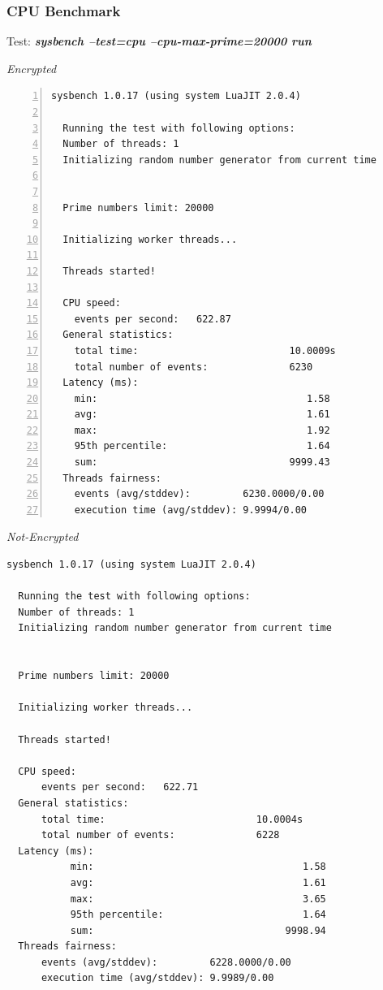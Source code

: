 \subsubsection{CPU Benchmark}
\begin{center}
  Test: \textbf{\textit{sysbench --test=cpu --cpu-max-prime=20000 run}}  
\end{center}
\vspace*{-\baselineskip}
\noindent\begin{minipage}[t]{0.45\linewidth}
  \centering
  \textit{Encrypted}
  \begin{lstlisting}[basicstyle=\tiny,frame=single, numbers=left, label=cpu_test1]
  sysbench 1.0.17 (using system LuaJIT 2.0.4)
  
  Running the test with following options:
  Number of threads: 1
  Initializing random number generator from current time
  
  
  Prime numbers limit: 20000
  
  Initializing worker threads...
  
  Threads started!

  CPU speed:
    events per second:   622.87
  General statistics:             
    total time:                          10.0009s
    total number of events:              6230       
  Latency (ms):                                 
    min:                                    1.58
    avg:                                    1.61        
    max:                                    1.92        
    95th percentile:                        1.64        
    sum:                                 9999.43        
  Threads fairness:
    events (avg/stddev):         6230.0000/0.00
    execution time (avg/stddev): 9.9994/0.00  
  \end{lstlisting}
\end{minipage}
\hspace{0.5cm}
\noindent\begin{minipage}[t]{0.45\linewidth}
  \centering
  \textit{Not-Encrypted}
  \begin{lstlisting}[basicstyle=\tiny,frame=single, label=cpu_test2]
  sysbench 1.0.17 (using system LuaJIT 2.0.4)
  
  Running the test with following options:
  Number of threads: 1
  Initializing random number generator from current time
  
  
  Prime numbers limit: 20000
  
  Initializing worker threads...
  
  Threads started!
  
  CPU speed:
      events per second:   622.71
  General statistics:
      total time:                          10.0004s
      total number of events:              6228
  Latency (ms):
           min:                                    1.58
           avg:                                    1.61
           max:                                    3.65
           95th percentile:                        1.64
           sum:                                 9998.94
  Threads fairness:
      events (avg/stddev):         6228.0000/0.00
      execution time (avg/stddev): 9.9989/0.00
  \end{lstlisting}
\end{minipage}

